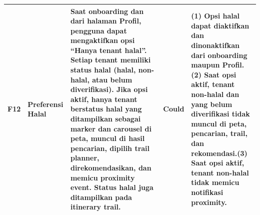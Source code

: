 \begin{longtable}{|L{0.082}|L{0.224}|L{0.296}|L{0.093}|L{0.304}|}
F12 & Preferensi Halal & Saat onboarding dan dari halaman Profil, pengguna dapat mengaktifkan opsi ``Hanya tenant halal''. Setiap tenant memiliki status halal (halal, non-halal, atau belum diverifikasi). Jika opsi aktif, hanya tenant berstatus halal yang ditampilkan sebagai marker dan carousel di peta, muncul di hasil pencarian, dipilih trail planner, direkomendasikan, dan memicu proximity event. Status halal juga ditampilkan pada itinerary trail. & Could & (1) Opsi halal dapat diaktifkan dan dinonaktifkan dari onboarding maupun Profil.\newline (2) Saat opsi aktif, tenant non-halal dan yang belum diverifikasi tidak muncul di peta, pencarian, trail, dan rekomendasi.\newline (3) Saat opsi aktif, tenant non-halal tidak memicu notifikasi proximity. \\ \hline
\end{longtable}
